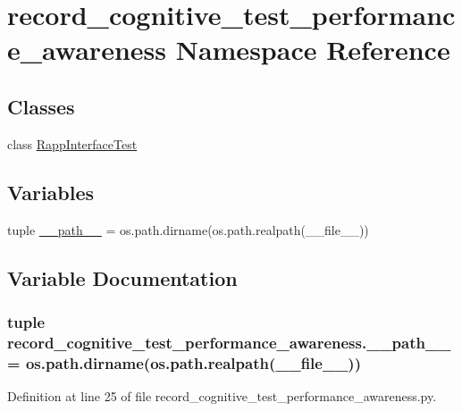 \hypertarget{namespacerecord__cognitive__test__performance__awareness}{\section{record\-\_\-cognitive\-\_\-test\-\_\-performance\-\_\-awareness Namespace Reference}
\label{namespacerecord__cognitive__test__performance__awareness}
}
\subsection*{Classes}
\begin{DoxyCompactItemize}
\item 
class \hyperlink{classrecord__cognitive__test__performance__awareness_1_1RappInterfaceTest}{Rapp\-Interface\-Test}
\end{DoxyCompactItemize}
\subsection*{Variables}
\begin{DoxyCompactItemize}
\item 
tuple \hyperlink{namespacerecord__cognitive__test__performance__awareness_aad3ccc8b25fa57534ea8a9f1a45d577e}{\-\_\-\-\_\-path\-\_\-\-\_\-} = os.\-path.\-dirname(os.\-path.\-realpath(\-\_\-\-\_\-file\-\_\-\-\_\-))
\end{DoxyCompactItemize}


\subsection{Variable Documentation}
\hypertarget{namespacerecord__cognitive__test__performance__awareness_aad3ccc8b25fa57534ea8a9f1a45d577e}{
\subsubsection[{\-\_\-\-\_\-path\-\_\-\-\_\-}]{\setlength{\rightskip}{0pt plus 5cm}tuple record\-\_\-cognitive\-\_\-test\-\_\-performance\-\_\-awareness.\-\_\-\-\_\-path\-\_\-\-\_\- = os.\-path.\-dirname(os.\-path.\-realpath(\-\_\-\-\_\-file\-\_\-\-\_\-))}}\label{namespacerecord__cognitive__test__performance__awareness_aad3ccc8b25fa57534ea8a9f1a45d577e}


Definition at line 25 of file record\-\_\-cognitive\-\_\-test\-\_\-performance\-\_\-awareness.\-py.


